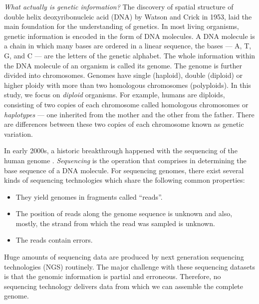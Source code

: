\textit{What actually is genetic information?} 
The discovery of spatial structure of double helix deoxyribonucleic acid (DNA) by Watson and Crick in 1953, laid the main foundation for the understanding of genetics.
In most living organisms, genetic information is encoded in the form of DNA molecules.
A DNA molecule is a chain in which many bases are ordered in a linear sequence, the bases --- A, T, G, and C --- are the letters of the genetic alphabet.
The whole information within the DNA molecule of an organism is called its genome. The genome is further divided into chromosomes.
Genomes have single (haploid), double (diploid) or higher ploidy with more than two homologous chromosomes (polyploids). 
In this study, we focus on \textit{diploid} organisms. For example, humans are diploids, consisting of two copies of each chromosome called homologous chromosomes or \textit{haplotypes} --- one inherited from the mother and the other from the father.
There are differences between these two copies of each chromosome known as genetic variation. 

In early 2000s, a historic breakthrough happened with the sequencing of the human genome \citep{collins2003human}.
\textit{Sequencing} is the operation that comprises in determining the base sequence of a DNA molecule.
For sequencing genomes, there exist several kinds of sequencing technologies which share the following common properties:
\begin{itemize}
 \item They yield genomes in fragments called ``reads''.
 \item The position of reads along the genome sequence is unknown and also, mostly, the strand from which the read was sampled is unknown.
 \item The reads contain errors.
\end{itemize}

\bigskip
Huge amounts of sequencing data are produced by next generation sequencing technologies (NGS) routinely. 
The major challenge with these sequencing datasets is that the genomic information is partial and erroneous. Therefore, no sequencing technology delivers data from which we can assemble the complete genome.

